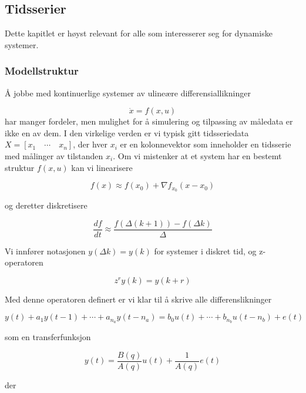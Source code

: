 \subsection{Tidsserier}
Dette kapitlet er høyst relevant for alle som interesserer seg for dynamiske systemer.

\subsubsection{Modellstruktur}
Å jobbe med kontinuerlige systemer av ulineære differensiallikninger

\begin{equation}
	\dot{x} = f(x, u)
\end{equation}
har manger fordeler, men mulighet for å simulering og tilpassing av måledata er ikke en av dem. I den virkelige verden er vi typisk gitt tidsseriedata $X = [x_1 \quad \cdots \quad x_n]$, der hver $x_i$ er en kolonnevektor som inneholder en tidsserie med målinger av tilstanden $x_i$. Om vi mistenker at et system har en bestemt struktur $f(x, u)$ kan vi linearisere

\begin{equation}
	f(x) \approx f(x_0) + \nabla f_{x_0} (x - x_0)
\end{equation}

og deretter diskretisere

\begin{equation}
	\frac{df}{dt} \approx \frac{f(\Delta (k+1)) - f(\Delta k)}{\Delta}
\end{equation}

Vi innfører notasjonen $y(\Delta k) = y(k)$ for systemer i diskret tid, og z-operatoren

\begin{equation}
	z^r y(k) = y(k + r)
\end{equation}

Med denne operatoren definert er vi klar til å skrive alle differenslikninger

\begin{equation}
	y(t) + a_1 y(t-1) + \cdots + a_{n_a} y(t - n_a) = b_0 u(t) + \cdots + b_{n_b} u(t - n_b) + e(t)
\end{equation}

som en transferfunksjon

\begin{equation}
y(t) = \frac{B(q)}{A(q)} u(t) + \frac{1}{A(q)}e(t)
\end{equation}

der 

